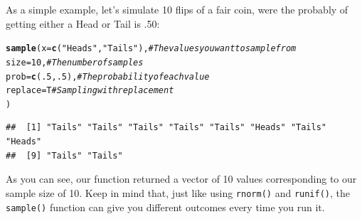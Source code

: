 \documentclass{tufte-book}\usepackage[]{graphicx}\usepackage[]{color}
\makeatletter
\newcommand{\hlnum}[1]{\textcolor[rgb]{0.686,0.059,0.569}{#1}}%
\newcommand{\hlstr}[1]{\textcolor[rgb]{0.192,0.494,0.8}{#1}}%
\newcommand{\hlcom}[1]{\textcolor[rgb]{0.678,0.584,0.686}{\textit{#1}}}%
\newcommand{\hlstd}[1]{\textcolor[rgb]{0.345,0.345,0.345}{#1}}%
\newcommand{\hlkwc}[1]{\textcolor[rgb]{0.333,0.667,0.333}{#1}}%
\newcommand{\hlkwd}[1]{\textcolor[rgb]{0.737,0.353,0.396}{\textbf{#1}}}%
\newenvironment{kframe}{%
 \def\at@end@of@kframe{}%
 \ifinner\ifhmode%
  \def\at@end@of@kframe{\end{minipage}}%
  \begin{minipage}{\columnwidth}%
 \fi\fi%
 \def\FrameCommand##1{\hskip\@totalleftmargin \hskip-\fboxsep
 \colorbox{shadecolor}{##1}\hskip-\fboxsep
     \hskip-\linewidth \hskip-\@totalleftmargin \hskip\columnwidth}%
 \MakeFramed {\advance\hsize-\width
   \@totalleftmargin\z@ \linewidth\hsize
   \@setminipage}}%
 {\par\unskip\endMakeFramed%
 \at@end@of@kframe}
\newenvironment{knitrout}{}{} %
\makeatother
\begin{document}
As a simple example, let's simulate 10 flips of a fair coin, were the probably of getting either a Head or Tail is .50:

\begin{footnotesize}
\begin{knitrout}
\color{fgcolor}\begin{kframe}
\begin{alltt}
\hlkwd{sample}\hlstd{(}\hlkwc{x} \hlstd{=} \hlkwd{c}\hlstd{(}\hlstr{"Heads"}\hlstd{,} \hlstr{"Tails"}\hlstd{),} \hlcom{# The values you want to sample from}
       \hlkwc{size} \hlstd{=} \hlnum{10}\hlstd{,}  \hlcom{# The number of samples}
       \hlkwc{prob} \hlstd{=} \hlkwd{c}\hlstd{(}\hlnum{.5}\hlstd{,} \hlnum{.5}\hlstd{),} \hlcom{# The probability of each value}
       \hlkwc{replace} \hlstd{= T} \hlcom{# Sampling with replacement}
       \hlstd{)}
\end{alltt}
\begin{verbatim}
##  [1] "Tails" "Tails" "Tails" "Tails" "Tails" "Heads" "Tails" "Heads"
##  [9] "Tails" "Tails"
\end{verbatim}
\end{kframe}
\end{knitrout}
\end{footnotesize}

As you can see, our function returned a vector of 10 values corresponding to our sample size of 10. Keep in mind that, just like using \texttt{rnorm()} and \texttt{runif()}, the \texttt{sample()} function can give you different outcomes every time you run it.
\end{document}
